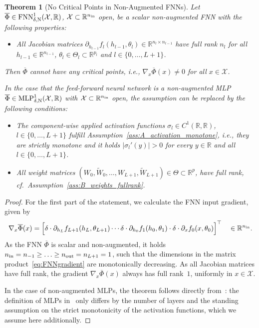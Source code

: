\documentclass[10pt]{article}
\newtheorem{theorem}{Theorem}[section]
\theoremstyle{definition}
\numberwithin{equation}{section}
\newcommand{\R}{\mathbb{R}}
\newcommand*{\nout}{n_\textup{out}}
\newcommand*{\nin}{n_\textup{in}}
\begin{document}
\begin{theorem}[No Critical Points in Non-Augmented FNNs]\label{th:mlp_criticalpoints}
    Let $\overline{\Phi} \in \textup{FNN}^1_{\delta,\textup{N}}(\mathcal{X},\R)$, $\mathcal{X}\subset \R^{\nin}$ open, be a scalar non-augmented FNN with the following properties:
    \begin{itemize}
        \item All Jacobian matrices $\partial_{h_{l-1}}f_l(h_{l-1},\theta_l)\in\R^{n_l\times n_{l-1}}$ have full rank $n_{l}$ for all $h_{l-1}\in\R^{n_{l-1}}$, $\theta_l \in \Theta_l\subset \R^{p_l}$ and $l \in \{0,\ldots,L+1\}$.
    \end{itemize}
    Then $\overline{\Phi}$ cannot have any critical points, i.e., $\nabla_x \overline{\Phi}(x) \neq 0$ for all $x \in \mathcal{X}$.
    
	In the case that the feed-forward neural network is a non-augmented MLP $\overline{\Phi} \in \textup{MLP}^1_{\delta,\textup{N}}(\mathcal{X},\R)$ with $\mathcal{X}\subset \R^{\nin}$ open, the assumption can be replaced by the following conditions:
	\begin{itemize}
		\item The component-wise applied activation functions $\sigma_l\in C^1(\R,\R)$, $l \in \{0,\ldots,L+1\}$ fulfill Assumption~\ref{ass:A_activation_monotone}, i.e., they are strictly monotone and it holds $ \lvert \sigma_l'(y) \rvert > 0$ for every $y \in \R$ and all $l \in \{0,\ldots,L+1\}$.
		\item All weight matrices $(W_0, \widetilde{W}_0, \ldots, W_{L+1}, \widetilde{W}_{L+1})\in \Theta \subset \R^p$, have full rank, cf.~Assumption~\ref{ass:B_weights_fullrank}.
	\end{itemize}
\end{theorem}

\begin{proof}
    For the first part of the statement, we calculate the FNN input gradient, given by
    \begin{equation} \label{eq:FNNgradient}
		\nabla_x \overline{\Phi}(x) = \Bigl[ \delta \cdot \partial_{h_{L}} f_{L+1}(h_{L},\theta_{L+1}) \cdots \delta \cdot\partial_{h_{0}} f_1(h_{0},\theta_1) \cdot \delta\cdot \partial_xf_0(x,\theta_0) \Bigr]^\top \quad \in \R^{\nin}.
	\end{equation}
    As the FNN $\overline{\Phi}$ is scalar and non-augmented, it holds $\nin = n_{-1} \geq  \ldots \geq \nout = n_{L+1} = 1$, such that the dimensions in the matrix product~\eqref{eq:FNNgradient} are monotonically decreasing. As all Jacobian matrices have full rank, the gradient $\nabla_x \overline{\Phi}(x)$ always has full rank~$1$, uniformly in $x \in \mathcal{X}$.

    In the case of non-augmented MLPs, the theorem follows directly from~\cite[Theorem~3.16]{kk2025}: the definition of MLPs in~\cite{kk2025} only differs by the number of layers and the standing assumption on the strict monotonicity of the activation functions, which we assume here additionally. 
\end{proof}
\end{document}
